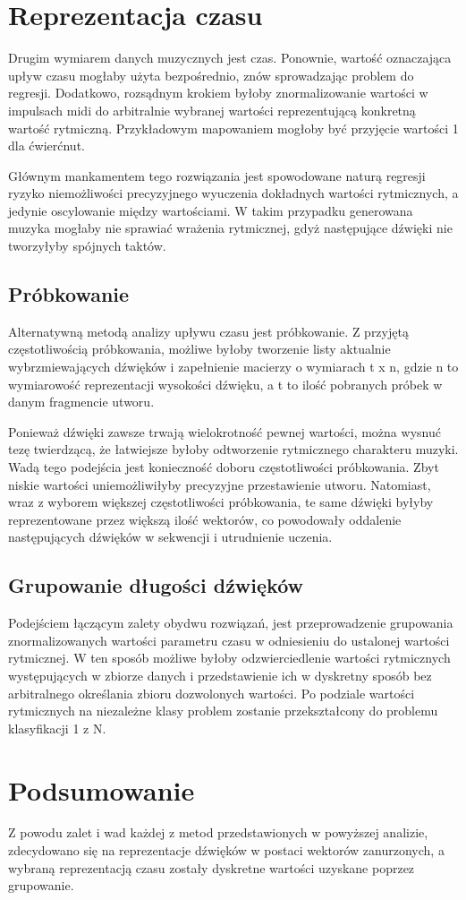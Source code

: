 {    \section{Reprezentacja czasu}
    {
        Drugim wymiarem danych muzycznych jest czas. Ponownie, wartość oznaczająca upływ czasu
        mogłaby użyta bezpośrednio, znów sprowadzając problem do regresji. Dodatkowo, rozsądnym krokiem
        byłoby znormalizowanie wartości w impulsach midi do arbitralnie wybranej wartości reprezentującą konkretną
        wartość rytmiczną. Przykładowym mapowaniem mogłoby być przyjęcie wartości 1 dla ćwierćnut.

        Głównym mankamentem tego rozwiązania jest spowodowane naturą regresji ryzyko niemożliwości precyzyjnego wyuczenia 
        dokładnych wartości rytmicznych, a jedynie oscylowanie między wartościami. W takim przypadku generowana muzyka
        mogłaby nie sprawiać wrażenia rytmicznej, gdyż następujące dźwięki nie tworzyłyby spójnych taktów. 

        \subsection{Próbkowanie}
        {
            Alternatywną metodą analizy upływu czasu jest próbkowanie. Z przyjętą częstotliwością próbkowania, 
            możliwe byłoby tworzenie listy aktualnie wybrzmiewających dźwięków i zapełnienie macierzy o wymiarach t x n, gdzie n to
            wymiarowość reprezentacji wysokości dźwięku, a t to ilość pobranych próbek w danym fragmencie utworu.
            
            Ponieważ dźwięki zawsze trwają wielokrotność pewnej wartości, można wysnuć tezę twierdzącą, że łatwiejsze byłoby 
            odtworzenie rytmicznego charakteru muzyki.
            Wadą tego podejścia jest konieczność doboru częstotliwości próbkowania. Zbyt niskie wartości 
            uniemożliwiłyby precyzyjne przestawienie utworu. Natomiast, wraz z wyborem większej częstotliwości próbkowania,
            te same dźwięki byłyby reprezentowane przez większą ilość wektorów, 
            co powodowały oddalenie następujących dźwięków w sekwencji i utrudnienie uczenia.
        }

        \subsection{Grupowanie długości dźwięków}
        {
            Podejściem łączącym zalety obydwu rozwiązań, jest przeprowadzenie grupowania znormalizowanych wartości parametru czasu w
            odniesieniu do ustalonej wartości rytmicznej. W ten sposób możliwe byłoby odzwierciedlenie wartości rytmicznych
            występujących w zbiorze danych i przedstawienie ich w dyskretny sposób bez arbitralnego określania zbioru dozwolonych
            wartości. 
            Po podziale wartości rytmicznych na niezależne klasy problem zostanie przekształcony do problemu klasyfikacji 1 z N.
        }
    }

    \section{Podsumowanie}
    {
        Z powodu zalet i wad każdej z metod przedstawionych w powyższej analizie, zdecydowano się na reprezentacje dźwięków w postaci
        wektorów zanurzonych, a wybraną reprezentacją czasu zostały dyskretne wartości uzyskane poprzez grupowanie.
    }
}